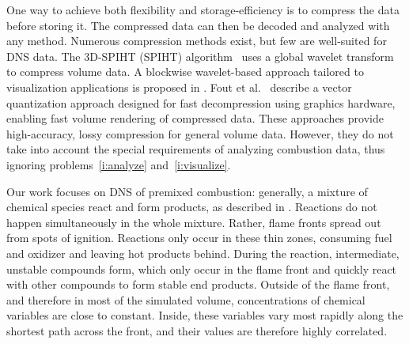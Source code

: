 
One way to achieve both flexibility and storage-efficiency is to compress the
data before storing it. The compressed data can then be decoded and analyzed
with any method. Numerous compression methods exist, but few are well-suited for
\ac{DNS} data. The \ac{3D}-\acs{SPIHT} (\acl{SPIHT})
algorithm~\cite{Kim2000} uses a global wavelet transform to compress volume
data. A blockwise wavelet-based approach tailored to visualization applications
is proposed in \cite{Nguyen2001}. Fout et al.~\cite{Fout2005} describe a vector
quantization approach designed for fast decompression using graphics hardware,
enabling fast volume rendering of compressed data. These approaches provide
high-accuracy, lossy compression for general volume data. However, they do not
take into account the special requirements of analyzing combustion data, thus
ignoring problems~\ref{i:analyze} and~\ref{i:visualize}.
%

%
Our work focuses on \ac{DNS} of premixed combustion: generally, a mixture of chemical
species react and form products, as described in \cite{Fru2011}. Reactions do
not happen simultaneously in the whole mixture. Rather, flame fronts spread out
from spots of ignition. Reactions only occur in these thin zones, consuming fuel
and oxidizer and leaving hot products behind. During the reaction, intermediate,
unstable compounds form, which only occur in the flame front and quickly react
with other compounds to form stable end products. Outside of the flame front,
and therefore in most of the simulated volume, concentrations of chemical
variables are close to constant. Inside, these variables vary most rapidly along
the shortest path across the front, and their values are therefore highly
correlated.

